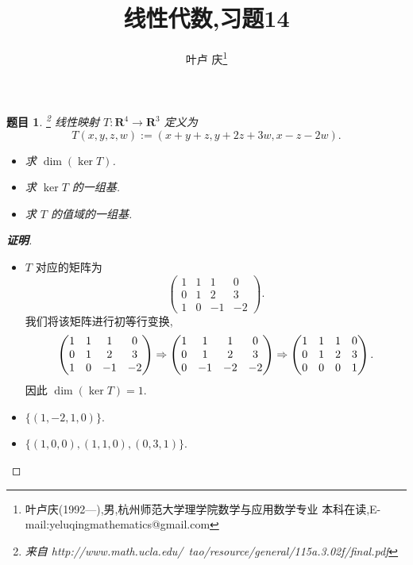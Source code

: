 \documentclass[a4paper]{article}
\newtheorem*{exe}{题目}
\newenvironment{exercise}
{\bigskip\begin{mdframed}\begin{exe}}
    {\end{exe}\end{mdframed}\bigskip}
\begin{document}
\title{\huge{\bf{线性代数,习题14}}} \author{\small{叶卢
    庆\footnote{叶卢庆(1992---),男,杭州师范大学理学院数学与应用数学专业
      本科在读,E-mail:yeluqingmathematics@gmail.com}}}
\maketitle
\begin{exercise}\footnote{来自 http://www.math.ucla.edu/~tao/resource/general/115a.3.02f/final.pdf}
  线性映射 $T:\mathbf{R}^4\to \mathbf{R}^3$ 定义为
$$
T(x,y,z,w):=(x+y+z,y+2z+3w,x-z-2w).
$$
\begin{itemize}
\item 求 $\dim(\ker T)$.
\item 求 $\ker T$ 的一组基.
\item 求 $T$ 的值域的一组基.
\end{itemize}
\end{exercise}
\begin{proof}[\textbf{证明}]
\begin{itemize}
\item $T$ 对应的矩阵为
$$
\begin{pmatrix}
  1&1&1&0\\
0&1&2&3\\
1&0&-1&-2
\end{pmatrix}.
$$
我们将该矩阵进行初等行变换,
\begin{align*}
  \begin{pmatrix}
  1&1&1&0\\
0&1&2&3\\
1&0&-1&-2
\end{pmatrix}\Rightarrow
\begin{pmatrix}
  1&1&1&0\\
0&1&2&3\\
0&-1&-2&-2
\end{pmatrix}\Rightarrow
\begin{pmatrix}
  1&1&1&0\\
0&1&2&3\\
0&0&0&1
\end{pmatrix}.
\end{align*}
因此 $\dim (\ker T)=1$.
\item $\{(1,-2,1,0)\}$.
\item $\{(1,0,0),(1,1,0),(0,3,1)\}$.
\end{itemize}
\end{proof}
\end{document}
